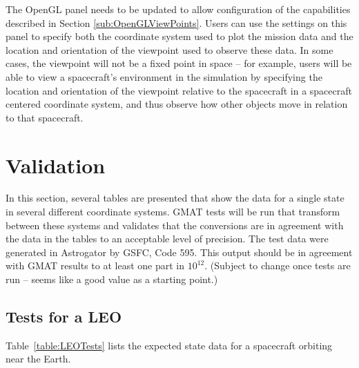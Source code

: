 The OpenGL panel needs to be updated to allow configuration of the capabilities described in Section
\ref{sub:OpenGLViewPoints}. Users can use the settings on this panel to specify both the coordinate
system used to plot the mission data and the location and orientation of the viewpoint used to
observe these data. In some cases, the viewpoint will not be a fixed point in space -- for example,
users will be able to view a spacecraft's environment in the simulation by specifying the location
and orientation of the viewpoint relative to the spacecraft in a spacecraft centered coordinate
system, and thus observe how other objects move in relation to that spacecraft.

\section{Validation}

In this section, several tables are presented that show the data for a single state in several
different coordinate systems. GMAT tests will be run that transform between these systems and
validates that the conversions are in agreement with the data in the tables to an acceptable level
of precision. The test data were generated in Astrogator by GSFC, Code 595. This output should be in
agreement with GMAT results to at least one part in $10^{12}$. (Subject to change once tests are run
-- seems like a good value as a starting point.)

\subsection{Tests for a LEO}

Table~\ref{table:LEOTests} lists the expected state data for a spacecraft orbiting near the Earth.

